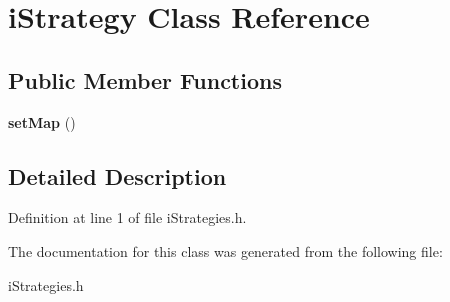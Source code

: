 \hypertarget{classi_strategy}{}\section{i\+Strategy Class Reference}
\label{classi_strategy}
\subsection*{Public Member Functions}
\begin{DoxyCompactItemize}
\item 
\hypertarget{classi_strategy_adf51883b78c44193514023a7200b50da}{}\label{classi_strategy_adf51883b78c44193514023a7200b50da} 
{\bfseries set\+Map} ()
\end{DoxyCompactItemize}


\subsection{Detailed Description}


Definition at line 1 of file i\+Strategies.\+h.



The documentation for this class was generated from the following file\+:\begin{DoxyCompactItemize}
\item 
i\+Strategies.\+h\end{DoxyCompactItemize}
